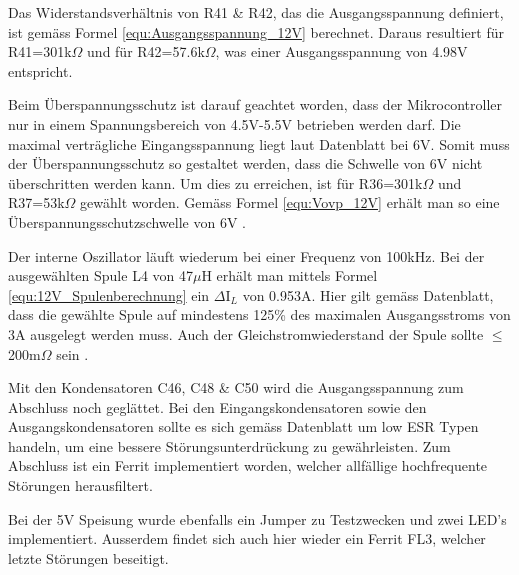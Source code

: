 Das Widerstandsverhältnis von R41 \& R42, das die Ausgangsspannung definiert, ist gemäss Formel \ref{equ:Ausgangsspannung_12V} berechnet. Daraus resultiert für R41=301k$\Omega$ und für R42=57.6k$\Omega$, was einer Ausgangsspannung von 4.98V entspricht. 

Beim Überspannungsschutz ist darauf geachtet worden, dass der Mikrocontroller nur in einem Spannungsbereich von 4.5V-5.5V betrieben werden darf. Die maximal verträgliche Eingangsspannung liegt laut Datenblatt bei 6V. Somit muss der Überspannungsschutz so gestaltet werden, dass die Schwelle von 6V nicht überschritten werden kann. Um dies zu erreichen, ist für R36=301k$\Omega$ und R37=53k$\Omega$ gewählt worden. Gemäss Formel \ref{equ:Vovp_12V} erhält man so eine Überspannungsschutzschwelle von 6V \cite[S.1]{atmel_atmel_2014}.

Der interne Oszillator läuft wiederum bei einer Frequenz von 100kHz. Bei der ausgewählten Spule L4 von 47$\mu$H erhält man mittels Formel \ref{equ:12V_Spulenberechnung} ein $\Delta$I$_{L}$ von 0.953A. Hier gilt gemäss Datenblatt, dass die gewählte Spule auf mindestens 125\% des maximalen Ausgangsstroms von 3A ausgelegt werden muss. Auch der Gleichstromwiederstand der Spule sollte $ \leq \ $ 200m$\Omega$  sein \cite[S.3]{monolithic_power_systems_mp24943_2011}. 

Mit den Kondensatoren C46, C48 \& C50 wird die Ausgangsspannung zum Abschluss noch geglättet. Bei den Eingangskondensatoren sowie den Ausgangskondensatoren sollte es sich gemäss Datenblatt um low ESR Typen handeln, um eine bessere Störungsunterdrückung zu gewährleisten. Zum Abschluss ist ein Ferrit implementiert worden, welcher allfällige hochfrequente Störungen herausfiltert.

Bei der 5V Speisung wurde ebenfalls ein Jumper zu Testzwecken und zwei LED's implementiert. Ausserdem findet sich auch hier wieder ein Ferrit FL3, welcher letzte Störungen beseitigt. 


